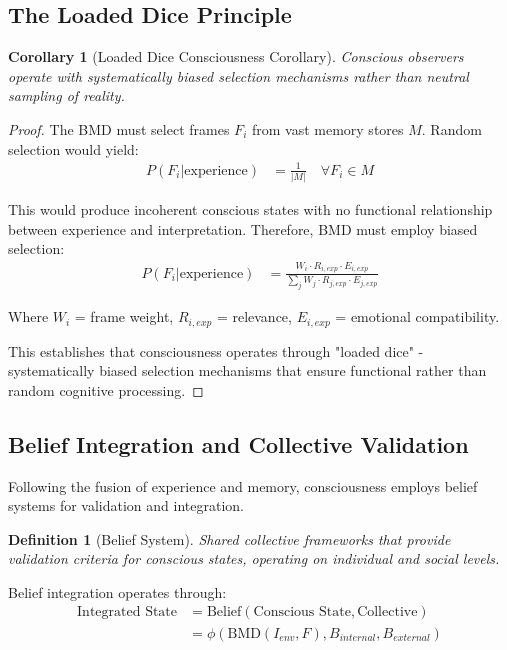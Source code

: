 \documentclass[12pt,a4paper]{article}
\newtheorem{corollary}[theorem]{Corollary}
\newtheorem{definition}[theorem]{Definition}
\begin{document}
\subsection{The Loaded Dice Principle}

\begin{corollary}[Loaded Dice Consciousness Corollary]
Conscious observers operate with systematically biased selection mechanisms rather than neutral sampling of reality.
\end{corollary}

\begin{proof}
The BMD must select frames $F_i$ from vast memory stores $M$. Random selection would yield:
\begin{align}
P(F_i | \text{experience}) &= \frac{1}{|M|} \quad \forall F_i \in M
\end{align}

This would produce incoherent conscious states with no functional relationship between experience and interpretation. Therefore, BMD must employ biased selection:
\begin{align}
P(F_i | \text{experience}) &= \frac{W_i \cdot R_{i,exp} \cdot E_{i,exp}}{\sum_j W_j \cdot R_{j,exp} \cdot E_{j,exp}}
\end{align}

Where $W_i$ = frame weight, $R_{i,exp}$ = relevance, $E_{i,exp}$ = emotional compatibility.

This establishes that consciousness operates through "loaded dice" - systematically biased selection mechanisms that ensure functional rather than random cognitive processing.
\end{proof}

\subsection{Belief Integration and Collective Validation}

Following the fusion of experience and memory, consciousness employs belief systems for validation and integration.

\begin{definition}[Belief System]
Shared collective frameworks that provide validation criteria for conscious states, operating on individual and social levels.
\end{definition}

Belief integration operates through:
\begin{align}
\text{Integrated State} &= \text{Belief}(\text{Conscious State}, \text{Collective}) \\
&= \phi(\text{BMD}(I_{env}, F), B_{internal}, B_{external})
\end{align}
\end{document}
